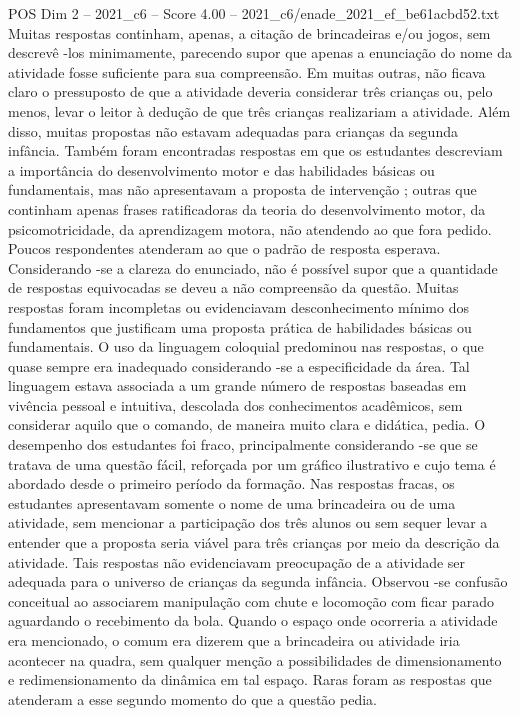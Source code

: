 \begin{textsample}{POS Dim 2 – 2021\_c6 – Score 4.00 – 2021\_c6/enade\_2021\_ef\_be61acbd52.txt}
Muitas respostas continham, apenas, a citação de brincadeiras e/ou jogos, sem descrevê -los minimamente, parecendo supor que apenas a enunciação do nome da atividade fosse suficiente para sua compreensão.
Em muitas outras, não ficava claro o pressuposto de que a atividade deveria considerar três crianças ou, pelo menos, levar o leitor à dedução de que três crianças realizariam a atividade.
Além disso, muitas propostas não estavam adequadas para crianças da segunda infância.
Também foram encontradas respostas em que os estudantes descreviam a importância do desenvolvimento motor e das habilidades básicas ou fundamentais, mas não apresentavam a proposta de intervenção ; outras que continham apenas frases ratificadoras da teoria do desenvolvimento motor, da psicomotricidade, da aprendizagem motora, não atendendo ao que fora pedido.
Poucos respondentes atenderam ao que o padrão de resposta esperava.
Considerando -se a clareza do enunciado, não é possível supor que a quantidade de respostas equivocadas se deveu a não compreensão da questão.
Muitas respostas foram incompletas ou evidenciavam desconhecimento mínimo dos fundamentos que justificam uma proposta prática de habilidades básicas ou fundamentais.
O uso da linguagem coloquial predominou nas respostas, o que quase sempre era inadequado considerando -se a especificidade da área.
Tal linguagem estava associada a um grande número de respostas baseadas em vivência pessoal e intuitiva, descolada dos conhecimentos acadêmicos, sem considerar aquilo que o comando, de maneira muito clara e didática, pedia.
O desempenho dos estudantes foi fraco, principalmente considerando -se que se tratava de uma questão fácil, reforçada por um gráfico ilustrativo e cujo tema é abordado desde o primeiro período da formação.
Nas respostas fracas, os estudantes apresentavam somente o nome de uma brincadeira ou de uma atividade, sem mencionar a participação dos três alunos ou sem sequer levar a entender que a proposta seria viável para três crianças por meio da descrição da atividade.
Tais respostas não evidenciavam preocupação de a atividade ser adequada para o universo de crianças da segunda infância.
Observou -se confusão conceitual ao associarem manipulação com chute e locomoção com ficar parado aguardando o recebimento da bola.
Quando o espaço onde ocorreria a atividade era mencionado, o comum era dizerem que a brincadeira ou atividade iria acontecer na quadra, sem qualquer menção a possibilidades de dimensionamento e redimensionamento da dinâmica em tal espaço.
Raras foram as respostas que atenderam a esse segundo momento do que a questão pedia.

\end{textsample}
